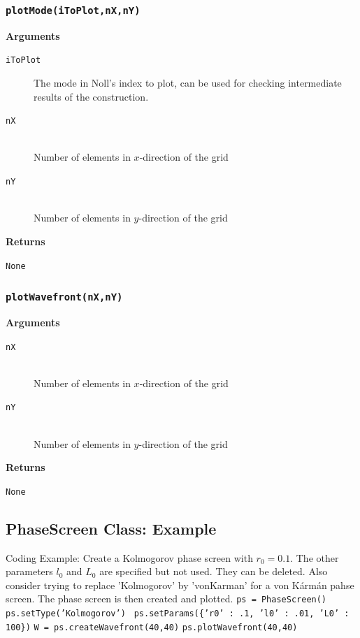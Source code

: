 \documentclass{article}
\begin{document}
\newpage
\subsubsection*{\texttt{plotMode(iToPlot,nX,nY)}}
\textbf{Arguments}
\begin{description}
  \item[\texttt{iToPlot}]
  The mode in Noll's index to plot, can be used for checking intermediate results of the construction.
  \item[\texttt{nX}] \hfill \\
  Number of elements in $x$-direction of the grid
  \item[\texttt{nY}] \hfill \\
 	Number of elements in $y$-direction of the grid
\end{description}
\textbf{Returns}
\begin{description}
	\item[\texttt{None}]
\end{description}

\newpage
\subsubsection*{\texttt{plotWavefront(nX,nY)}}
\textbf{Arguments}
\begin{description}
  \item[\texttt{nX}] \hfill \\
  Number of elements in $x$-direction of the grid
  \item[\texttt{nY}] \hfill \\
 	Number of elements in $y$-direction of the grid
\end{description}
\textbf{Returns}
\begin{description}
	\item[\texttt{None}]
\end{description}

\newpage
\subsection{PhaseScreen Class: Example}
Coding Example: Create a Kolmogorov phase screen with $r_0 = 0.1$. The other parameters $l_0$ and $L_0$ are specified but not used. They can be deleted. Also consider trying to replace 'Kolmogorov' by 'vonKarman' for a von K{\'a}rm{\'a}n pahse screen. The phase screen is then created and plotted.
\texttt{ps = PhaseScreen()}
\texttt{ps.setType('Kolmogorov') }
\texttt{ps.setParams(\{'r0' : .1, 'l0' : .01, 'L0' : 100\})}
\texttt{W = ps.createWavefront(40,40)}
\texttt{ps.plotWavefront(40,40)}
\end{document}

